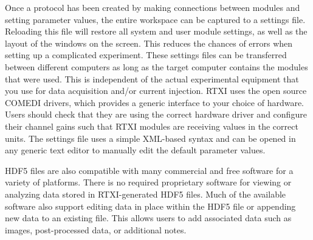 Once a protocol has been created by making connections between modules and setting parameter values, the entire workspace can be captured to a settings file. Reloading this file will restore all system and user module settings, as well as the layout of the windows on the screen. This reduces the chances of errors when setting up a complicated experiment. These settings files can be transferred between different computers as long as the target computer contains the modules that were used. This is independent of the actual experimental equipment that you use for data acquisition and/or current injection. RTXI uses the open source COMEDI drivers, which provides a generic interface to your choice of hardware. Users should check that they are using the correct hardware driver and configure their channel gains such that RTXI modules are receiving values in the correct units. The settings file uses a simple XML-based syntax and can be opened in any generic text editor to manually edit the default parameter values.

HDF5 files are also compatible with many commercial and free software for a variety of platforms. There is no required proprietary software for viewing or analyzing data stored in RTXI-generated HDF5 files. Much of the available software also support editing data in place within the HDF5 file or appending new data to an existing file. This allows users to add associated data such as images, post-processed data, or additional notes.